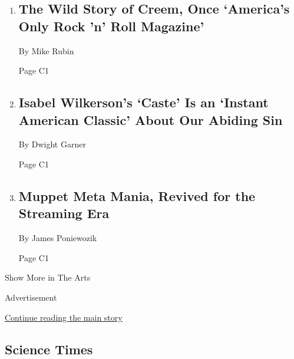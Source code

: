 \begin{enumerate}
\def\labelenumi{\arabic{enumi}.}
\item
  \href{/2020/08/03/arts/music/creem-magazine-documentary.html}{}

  \hypertarget{the-wild-story-of-creem-once-americas-only-rock-n-roll-magazine}{%
  \subsection{The Wild Story of Creem, Once `America's Only Rock 'n'
  Roll
  Magazine'}\label{the-wild-story-of-creem-once-americas-only-rock-n-roll-magazine}}

  By Mike Rubin

  Page C1
\item
  \href{/2020/07/31/books/review-caste-isabel-wilkerson-origins-of-our-discontents.html}{}

  \hypertarget{isabel-wilkersons-caste-is-an-instant-american-classic-about-our-abiding-sin}{%
  \subsection{Isabel Wilkerson's `Caste' Is an `Instant American
  Classic' About Our Abiding
  Sin}\label{isabel-wilkersons-caste-is-an-instant-american-classic-about-our-abiding-sin}}

  By Dwight Garner

  Page C1
\item
  \href{/2020/07/31/arts/television/muppets-now.html}{}

  \hypertarget{muppet-meta-mania-revived-for-the-streaming-era-1}{%
  \subsection{Muppet Meta Mania, Revived for the Streaming
  Era}\label{muppet-meta-mania-revived-for-the-streaming-era-1}}

  By James Poniewozik

  Page C1
\end{enumerate}

Show More in The Arts

Advertisement

\protect\hyperlink{after-mid5}{Continue reading the main story}

\hypertarget{science-times}{%
\subsection{Science Times}\label{science-times}}

